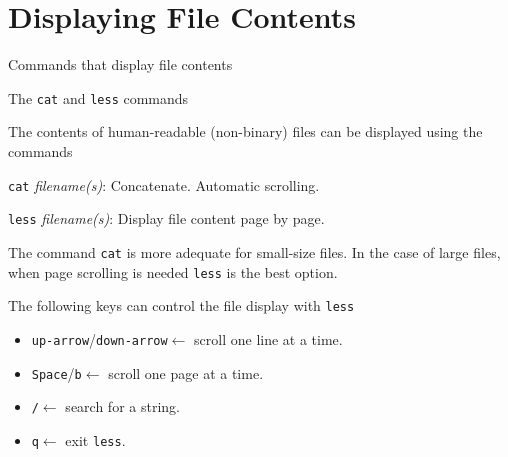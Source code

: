 \section{Displaying File Contents}
\begin{frame}[fragile]{Commands that display file contents}
  
  \begin{block}{ The \alert{\texttt{cat}} and \alert{\texttt{less}} commands}
    
    {\footnotesize
      The contents of \alert{human-readable} (non-binary) files can be displayed using the commands}

    \begin{center}
  \begin{itemize}
    {\small
\item \alert{\texttt{cat} \emph{filename(s)}}: Concatenate. Automatic scrolling.
\item \alert{\texttt{less} \emph{filename(s)}}: Display file content page by page.
  }
\end{itemize}
\end{center}


{\small The command \texttt{cat} is more adequate for small-size files. In the case of large files, when page scrolling is needed \texttt{less} is the best option. 
\vspace{0.25cm}

The following keys can control the file display with \texttt{less}}
\footnotesize{
\begin{itemize}
\item \texttt{up-arrow}/\texttt{down-arrow}$\leftarrow$ scroll one line at a time. 
\item \texttt{Space}/\texttt{b}$\leftarrow$ scroll one page at a time.
\item \texttt{/}$\leftarrow$ search for a string.
\item \texttt{q}$\leftarrow$ exit \texttt{less}.
\end{itemize}
}

\end{block}


\end{frame}

